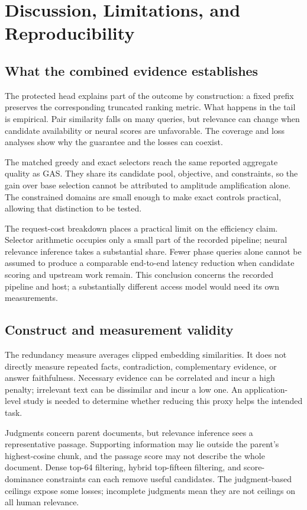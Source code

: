 \section{Discussion, Limitations, and Reproducibility}\label{sec:discussion}
\subsection{What the combined evidence establishes}
The protected head explains part of the outcome by construction: a fixed prefix preserves the corresponding truncated ranking metric. What happens in the tail is empirical. Pair similarity falls on many queries, but relevance can change when candidate availability or neural scores are unfavorable. The coverage and loss analyses show why the guarantee and the losses can coexist.

The matched greedy and exact selectors reach the same reported aggregate quality as GAS. They share its candidate pool, objective, and constraints, so the gain over base selection cannot be attributed to amplitude amplification alone. The constrained domains are small enough to make exact controls practical, allowing that distinction to be tested.

The request-cost breakdown places a practical limit on the efficiency claim. Selector arithmetic occupies only a small part of the recorded pipeline; neural relevance inference takes a substantial share. Fewer phase queries alone cannot be assumed to produce a comparable end-to-end latency reduction when candidate scoring and upstream work remain. This conclusion concerns the recorded pipeline and host; a substantially different access model would need its own measurements.

\subsection{Construct and measurement validity}
The redundancy measure averages clipped embedding similarities. It does not directly measure repeated facts, contradiction, complementary evidence, or answer faithfulness. Necessary evidence can be correlated and incur a high penalty; irrelevant text can be dissimilar and incur a low one. An application-level study is needed to determine whether reducing this proxy helps the intended task.

Judgments concern parent documents, but relevance inference sees a representative passage. Supporting information may lie outside the parent's highest-cosine chunk, and the passage score may not describe the whole document. Dense top-64 filtering, hybrid top-fifteen filtering, and score-dominance constraints can each remove useful candidates. The judgment-based ceilings expose some losses; incomplete judgments mean they are not ceilings on all human relevance.

